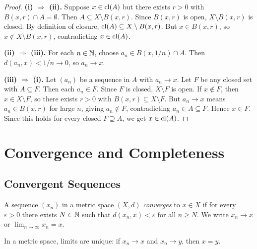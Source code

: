 \documentclass[11pt,a4paper]{article}
\begin{document}
\begin{proof}
\textbf{(i) $\Rightarrow$ (ii).}
Suppose $x \in \operatorname{cl}(A)$ but there exists $r > 0$ with
$B(x,r) \cap A = \emptyset$. Then $A \subseteq X \setminus B(x,r)$. Since
$B(x,r)$ is open, $X \setminus B(x,r)$ is closed. By definition of closure,
$\operatorname{cl}(A) \subseteq X \setminus B(x,r)$. But $x \in B(x,r)$, so
$x \notin X \setminus B(x,r)$, contradicting $x \in \operatorname{cl}(A)$.

\textbf{(ii) $\Rightarrow$ (iii).}
For each $n \in \mathbb{N}$, choose $a_n \in B(x, 1/n) \cap A$. Then
$d(a_n, x) < 1/n \to 0$, so $a_n \to x$.

\textbf{(iii) $\Rightarrow$ (i).}
Let $(a_n)$ be a sequence in $A$ with $a_n \to x$. Let $F$ be any closed set
with $A \subseteq F$. Then each $a_n \in F$. Since $F$ is closed,
$X \setminus F$ is open. If $x \notin F$, then $x \in X \setminus F$, so
there exists $r > 0$ with $B(x,r) \subseteq X \setminus F$. But $a_n \to x$
means $a_n \in B(x,r)$ for large $n$, giving $a_n \notin F$, contradicting
$a_n \in A \subseteq F$. Hence $x \in F$. Since this holds for every closed
$F \supseteq A$, we get $x \in \operatorname{cl}(A)$.
\end{proof}


\section{Convergence and Completeness}
\label{sec:completeness}

\subsection{Convergent Sequences}
\label{subsec:convergence}

\begin{definition}[Convergence]
\label{def:convergence}
A sequence $(x_n)$ in a metric space $(X,d)$ \emph{converges} to $x \in X$ if
for every $\varepsilon > 0$ there exists $N \in \mathbb{N}$ such that
$d(x_n, x) < \varepsilon$ for all $n \ge N$. We write $x_n \to x$ or
$\lim_{n \to \infty} x_n = x$.
\end{definition}

\begin{proposition}
\label{prop:unique_limit}
In a metric space, limits are unique: if $x_n \to x$ and $x_n \to y$, then
$x = y$.
\end{proposition}
\end{document}
